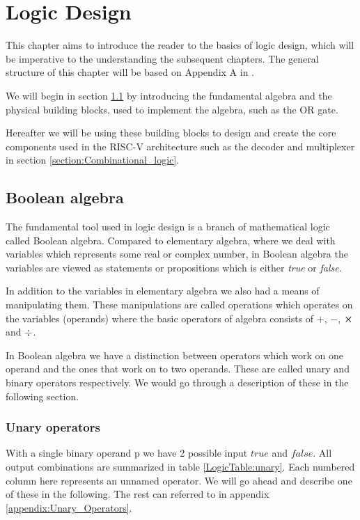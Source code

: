 \chapter{Logic Design}
    
    This chapter aims to introduce the reader to the basics of logic design, which will be imperative to the understanding the subsequent chapters. The general structure of this chapter will be based on Appendix A in \cite{riscVbook}. 
    
    We will begin in section \ref{section:Boolean_algebra} by introducing the fundamental algebra and the physical building blocks, used to implement the algebra, such as the OR gate. 
    
    Hereafter we will be using these building blocks to design and create the core components used in the RISC-V architecture such as the decoder and multiplexer in section \ref{section:Combinational_logic}. 

    \section{Boolean algebra}\label{section:Boolean_algebra}
    
        The fundamental tool used in logic design is a branch of mathematical logic called Boolean algebra. Compared to elementary algebra, where we deal with variables which represents some real or complex number, in Boolean algebra the variables are viewed as statements or propositions which is either \textit{true} or \textit{false}.
        
        In addition to the variables in elementary algebra we also had a means of manipulating them. These manipulations are called operations which operates on the variables (operands) where the basic operators of algebra consists of $+$, $-$, $\cross$ and $\divisionsymbol$.
        
        In Boolean algebra we have a distinction between operators which work on one operand and the ones that work on to two operands. These are called unary and binary operators respectively. We would go through a description of these in the following section. 
        
        \subsection{Unary operators}
        
            With a single binary operand p we have 2 possible input $true$ and $false$. All output combinations are summarized in table \ref{LogicTable:unary}. Each numbered column here represents an unnamed operator. We will go ahead and describe one of these in the following. The rest can referred to in appendix \ref{appendix:Unary_Operators}. 
            
